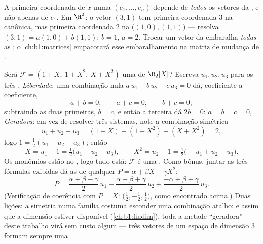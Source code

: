 \begin{remark}
\label{rem:b1:vspaces:teameffort}
A primeira coordenada de $x$ numa  $(e_1, \dots, e_n)$
depende de \emph{todos} os vetores da , e não apenas de $e_1$. Em
$\R^2$: o vetor $(3, 1)$ tem primeira coordenada $3$ na 
canônica, mas primeira coordenada $2$ na 
$\bigl((1,0), (1,1)\bigr)$ --- resolva $(3,1) = a(1,0) + b(1,1)$:
$b = 1$, $a = 2$. Trocar um vetor da  embaralha \emph{todas} as
; o \cref{ch:b1:matrices} empacotará esse embaralhamento na matriz de
mudança de .
\end{remark}

\begin{example}
\label{ex:b1:vspaces:testbasis}
Será $\mathcal{F} = (1 + X,\ 1 + X^2,\ X + X^2)$ uma  de
$\R_2[X]$? Escreva $u_1, u_2, u_3$ para os três .
\emph{Liberdade}: uma combinação nula $a\,u_1 + b\,u_2 + c\,u_3 =
0$ dá, coeficiente a
coeficiente,
\[
a + b = 0, \qquad a + c = 0, \qquad b + c = 0 ;
\]
subtraindo as duas primeiras, $b = c$, e então a terceira dá $2b =
0$: $a = b = c = 0$, . \emph{Geradora}: em vez de resolver três sistemas,
note a combinação simétrica
\[
u_1 + u_2 - u_3 = (1 + X) + (1 + X^2) - (X + X^2) = 2 ,
\]
logo $1 = \frac12(u_1 + u_2 - u_3)$; então
\[
X = u_1 - 1 = \tfrac12\bigl(u_1 - u_2 + u_3\bigr),
\qquad
X^2 = u_2 - 1 = \tfrac12\bigl(-u_1 + u_2 + u_3\bigr).
\]
Os monômios estão no , logo tudo está: $\mathcal{F}$
é uma . Como bônus, juntar as três fórmulas exibidas dá as
 de qualquer $P = \alpha + \beta X + \gamma X^2$:
\[
P = \frac{\alpha + \beta - \gamma}{2}\,u_1
+ \frac{\alpha - \beta + \gamma}{2}\,u_2
+ \frac{-\alpha + \beta + \gamma}{2}\,u_3 .
\]
(Verificação de coerência com $P = X$:  $\bigl(\frac12,
-\frac12, \frac12\bigr)$, como
encontrado acima.) Duas lições: a simetria numa família costuma
esconder uma combinação atalho; e assim que a dimensão estiver
disponível (\cref{ch:b1:findim}), toda a metade ``geradora'' deste trabalho virá
sem custo algum --- três vetores  de um espaço de dimensão $3$
formam sempre uma .
\end{example}

